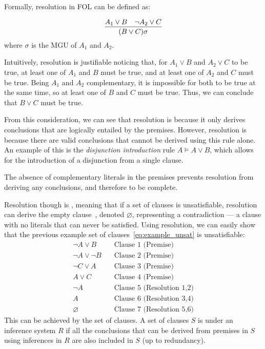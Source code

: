 Formally, resolution in FOL can be defined as:

\begin{equation}
  \infer{(B\lor C)\sigma}{A_1 \lor B & \neg A_2 \lor C}
\end{equation}
\indent where \(\sigma\) is the MGU of \(A_1\) and \(A_2\).

\noindent Intuitively, resolution is justifiable noticing that, for \(A_1 \lor B\) and \(A_2 \lor C\) to be true, at least one of \(A_1\) and \(B\) must be true, and at least one of \(A_2\) and \(C\) must be true.
Being \(A_1\) and \(A_2\) complementary, it is impossible for both to be true at the same time, so at least one of \(B\) and \(C\) must be true. Thus, we can conclude that \(B \lor C\) must be true.

From this consideration, we can see that resolution is  because it only derives conclusions that are logically entailed by the premises.
However, resolution is  because there are valid conclusions that cannot be derived using this rule alone.
An example of this is the \emph{disjunction introduction} rule \(A \models A \lor B\), which allows for the introduction of a disjunction from a single clause.

The absence of complementary literals in the premises prevents resolution from deriving any conclusions, and therefore to be complete.

Resolution though is , meaning that if a set of clauses is unsatisfiable, resolution can derive the empty clause~\cite{robinson1965}, denoted \(\varnothing\), representing a contradiction --- a clause with no literals that can never be satisfied.
Using resolution, we can easily show that the previous example set of clauses~\ref{eq:example_unsat} is unsatisfiable:
\begin{equation}
  \begin{aligned}
    \neg A \lor B &\quad \text{Clause 1 (Premise)} \\
    \neg A \lor \neg B &\quad \text{Clause 2 (Premise)} \\
    \neg C \lor A &\quad \text{Clause 3 (Premise)} \\
    A \lor C &\quad \text{Clause 4 (Premise)} \\
    \neg A &\quad \text{Clause 5 (Resolution 1,2)} \\
    A &\quad \text{Clause 6 (Resolution 3,4)} \\
    \varnothing &\quad \text{Clause 7 (Resolution 5,6)}
  \end{aligned}
\end{equation}
This can be achieved by  the set of clauses. A set of clauses \(S\) is  under an inference system \(R\) if all the conclusions that can be derived from premises in \(S\) using inferences in \(R\) are also included in \(S\) (up to redundancy).

